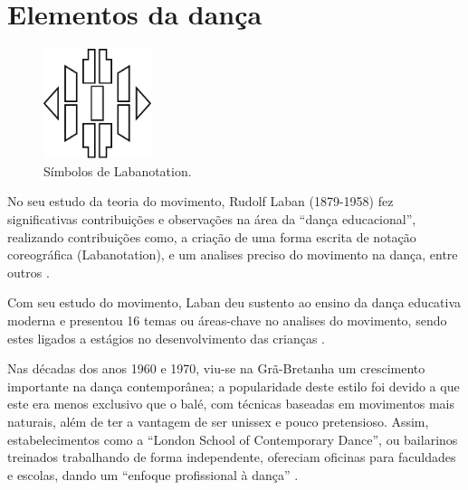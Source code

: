 
\section{Elementos da dança}
\begin{figure}
\vspace{-10pt}
\centering
\includegraphics[width=0.28\textwidth]{chapters/cap-dance-elements/Labanotation2.eps}
\caption{Símbolos de Labanotation.}
\label{fig:elementosdanca1old}
\vspace{-10pt}
\end{figure}
 No seu estudo da teoria do movimento, Rudolf Laban (1879-1958) fez significativas contribuições e
observações na área da ``dança  educacional'',  
realizando contribuições como, a criação de uma forma escrita de notação coreográfica (Labanotation), 
e um  analises preciso do movimento na dança, entre outros \cite[pp. 18]{elementosdanca2017} \cite[pp. 11]{paine2014complete}.

Com seu estudo do movimento, 
Laban  deu sustento ao ensino da dança educativa moderna e 
presentou 16 temas ou áreas-chave no analises do movimento, 
sendo estes ligados a estágios no desenvolvimento das crianças  \cite[pp. 12]{paine2014complete}.

Nas décadas dos anos 1960 e 1970, 
viu-se  na Grã-Bretanha um crescimento importante na dança contemporânea;
a popularidade deste estilo foi devido a que este era menos exclusivo que o balé, 
com técnicas baseadas em movimentos mais naturais, 
além de ter a vantagem de ser unissex e pouco pretensioso.
Assim, estabelecimentos como a ``London School of Contemporary Dance'',
ou bailarinos treinados trabalhando de forma independente,
ofereciam oficinas para faculdades e escolas,
dando um ``enfoque profissional à dança'' \cite[pp. 12]{paine2014complete}.

